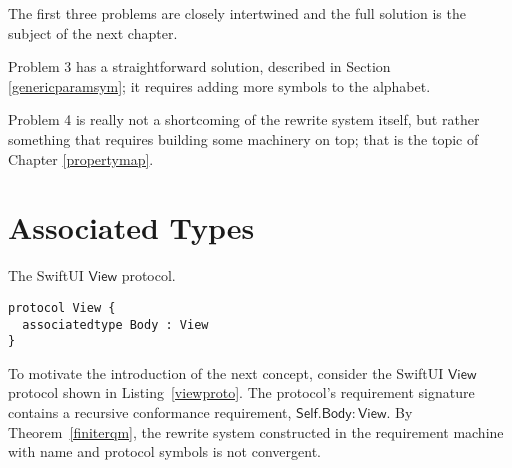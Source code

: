 \documentclass[headsepline,bibliography=totoc]{scrreport}
\newcommand{\namesym}[1]{\mathsf{#1}}
\newcommand{\genericparam}[1]{\bm{\mathsf{#1}}}
\newcommand{\proto}[1]{\bm{\mathsf{#1}}}
\theoremstyle{definition}
\theoremstyle{definition}
\theoremstyle{definition}
\begin{document}
The first three problems are closely intertwined and the full solution is the subject of the next chapter. 

Problem 3 has a straightforward solution, described in Section \ref{genericparamsym}; it requires adding more symbols to the alphabet.

Problem 4 is really not a shortcoming of the rewrite system itself, but rather something that requires building some machinery on top; that is the topic of Chapter \ref{propertymap}.

\chapter{Associated Types}\label{associatedtypes}

\begin{listing}\caption{The SwiftUI $\proto{View}$ protocol.}\label{viewproto}
\begin{Verbatim}
protocol View {
  associatedtype Body : View
}
\end{Verbatim}
\end{listing}

To motivate the introduction of the next concept, consider the SwiftUI $\proto{View}$ protocol shown in Listing~\ref{viewproto}. The protocol's requirement signature contains a recursive conformance requirement, $\genericparam{Self}.\namesym{Body}\colon \proto{View}$. By Theorem~\ref{finiterqm}, the rewrite system constructed in the requirement machine with name and protocol symbols is not convergent.
\end{document}
